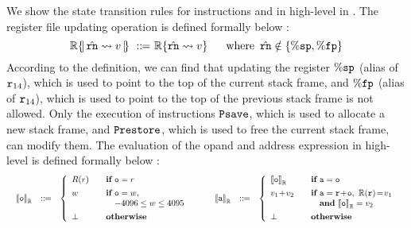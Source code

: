 We show the state transition rules for instructions \ld{} and \cadd{} 
in high-level in \Fig{\ref{fig:Transition rules for instructions ld and add in high-level}}. 
The register file updating operation is defined formally below : 
\[
    \hRfile\hRegUpd{\hrn \rightsquigarrow \val} \ \define \ 
    \hRfile\{ \hrn \rightsquigarrow \val \} \quad \ \ 
    \text{where } \, 
    \hrn \notin \{ \spreg, \fpreg \}
\] 
According to the definition, we can find that updating the register $\%\texttt{sp}$ 
(alias of $\texttt{r}_{14}$), which is used to point to the top of the current 
stack frame, and $\%{\texttt{fp}}$ (alias of $\texttt{r}_{14}$), which is used to point to 
the top of the previous stack frame is not allowed. Only the execution of instructions  
$\texttt{Psave}$, which is used to allocate a new stack frame, 
and $\texttt{Prestore}{}$, which is used to free the current stack frame, can modify them. 
The evaluation of the opand and address expression in high-level is defined formally 
below : 
\[
    \begin{array}{ll}
        \begin{array}{lcl}
            \evalR{\oexp}{\hRfile} & \define &
                \left\{
                    \begin{array}{ll}
                        R(r) &\quad \cif \ \oexp = r \\
                        \\[-8pt]
                        w &\quad \cif \ \oexp = \word, \\
                        & \quad \quad -4096 \leq \word \leq 4095 \\
                        \\[-8pt]
                        \perp &\quad \otherwise
                    \end{array}
                \right.
        \end{array} & \quad
        \begin{array}{lcl}
            \evalR{\aexp}{\hRfile} & \define &
                \left\{
                    \begin{array}{ll}
                        \evalR{\oexp}{\hRfile} &\quad \cif \ \aexp = \oexp \\
                        \\[-8pt]

                        \val_1 \!+\! \val_2
                        &\quad \cif \ \aexp = \regr \!+\! \oexp,\
                        \hRfile(\regr) \!=\! \val_1 \\
                        & \quad \quad \tand \ \evalR{\oexp}{\hRfile} = \val_2 \\

                        \\[-8pt]
                        \perp &\quad \otherwise
                    \end{array}
                \right.
        \end{array}
    \end{array}
\]

